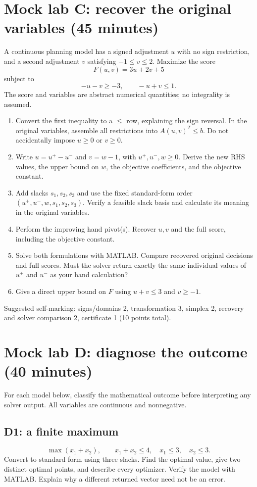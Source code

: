 \documentclass[11pt,a4paper]{article}
\begin{document}
\section{Mock lab C: recover the original variables (45 minutes)}
A continuous planning model has a signed adjustment $u$ with no sign
restriction, and a second adjustment $v$ satisfying $-1\leq v\leq2$.
Maximize the score
\[
  F(u,v)=3u+2v+5
\]
subject to
\[
  -u-v\geq-3,\qquad -u+v\leq1.
\]
The score and variables are abstract numerical quantities; no integrality is
assumed.
\begin{enumerate}[leftmargin=*]
  \item Convert the first inequality to a $\leq$ row, explaining the sign
        reversal. In the original variables, assemble all restrictions into
        $A(u,v)^T\leq b$. Do not accidentally impose $u\geq0$ or $v\geq0$.
  \item Write $u=u^+-u^-$ and $v=w-1$, with $u^+,u^-,w\geq0$.
        Derive the new RHS values, the upper bound on $w$, the objective
        coefficients, and the objective constant.
  \item Add slacks $s_1,s_2,s_3$ and use the fixed standard-form order
        $(u^+,u^-,w,s_1,s_2,s_3)$. Verify a feasible slack basis and calculate
        its meaning in the original variables.
  \item Perform the improving hand pivot(s). Recover $u,v$ and the full
        score, including the objective constant.
  \item Solve both formulations with MATLAB. Compare recovered original
        decisions and full scores. Must the solver return exactly the same
        individual values of $u^+$ and $u^-$ as your hand calculation?
  \item Give a direct upper bound on $F$ using $u+v\leq3$ and $v\geq-1$.
\end{enumerate}
Suggested self-marking: signs/domains 2, transformation 3, simplex 2,
recovery and solver comparison 2, certificate 1 (10 points total).

\clearpage
\section{Mock lab D: diagnose the outcome (40 minutes)}
For each model below, classify the mathematical outcome before interpreting
any solver output. All variables are continuous and nonnegative.
\subsection*{D1: a finite maximum}
\[
  \max(x_1+x_2),\qquad x_1+x_2\leq4,\quad x_1\leq3,\quad x_2\leq3.
\]
Convert to standard form using three slacks. Find the optimal value, give
two distinct optimal points, and describe every optimizer. Verify the model
with MATLAB. Explain why a different returned vector need not be an error.
\end{document}
